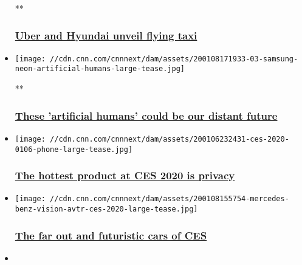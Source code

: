 \begin{itemize}
  **

  \hypertarget{uber-and-hyundai-unveil-flying-taxi}{%
  \subsubsection{\texorpdfstring{\href{/videos/business/2020/01/09/uber-hyundai-flying-taxi-orig.cnn-business}{Uber
  and Hyundai unveil flying
  taxi}}{Uber and Hyundai unveil flying taxi}}\label{uber-and-hyundai-unveil-flying-taxi}}
\item
  \href{/videos/business/2020/01/10/samsung-neon-star-labs-zw-gr-orig.cnn-business}{}

  \texttt{[image: //cdn.cnn.com/cnnnext/dam/assets/200108171933-03-samsung-neon-artificial-humans-large-tease.jpg]}

  **

  \hypertarget{these-artificial-humans-could-be-our-distant-future}{%
  \subsubsection{\texorpdfstring{\href{/videos/business/2020/01/10/samsung-neon-star-labs-zw-gr-orig.cnn-business}{These
  'artificial humans' could be our distant
  future}}{These 'artificial humans' could be our distant future}}\label{these-artificial-humans-could-be-our-distant-future}}
\item
  \href{/2020/01/07/tech/privacy-ces-2020/index.html}{}

  \texttt{[image: //cdn.cnn.com/cnnnext/dam/assets/200106232431-ces-2020-0106-phone-large-tease.jpg]}

  \hypertarget{the-hottest-product-at-ces-2020-is-privacy}{%
  \subsubsection{\texorpdfstring{\href{/2020/01/07/tech/privacy-ces-2020/index.html}{The
  hottest product at CES 2020 is
  privacy}}{The hottest product at CES 2020 is privacy}}\label{the-hottest-product-at-ces-2020-is-privacy}}
\item
  \href{/2020/01/09/tech/concept-cars-at-ces/index.html}{}

  \texttt{[image: //cdn.cnn.com/cnnnext/dam/assets/200108155754-mercedes-benz-vision-avtr-ces-2020-large-tease.jpg]}

  \hypertarget{the-far-out-and-futuristic-cars-of-ces-}{%
  \subsubsection{\texorpdfstring{\href{/2020/01/09/tech/concept-cars-at-ces/index.html}{The
  far out and futuristic cars of CES
  }}{The far out and futuristic cars of CES }}\label{the-far-out-and-futuristic-cars-of-ces-}}
\item
  \href{/2020/01/07/tech/apple-privacy-ces/index.html}{}


\end{itemize}
